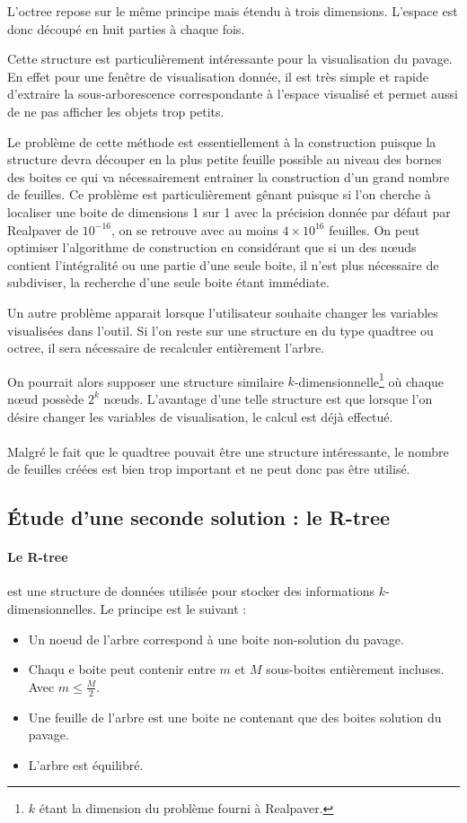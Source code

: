 \documentclass[11pt,a4paper,utf8x]{report}
\begin{document}
L'octree repose sur le même principe mais étendu à trois dimensions. L'espace est donc découpé en huit parties à chaque fois.

Cette structure est particulièrement intéressante pour la visualisation du pavage. En effet pour une fenêtre de visualisation donnée, il est très simple et rapide d'extraire la sous-arborescence correspondante à l'espace visualisé et permet aussi de ne pas afficher les objets trop petits.

Le problème de cette méthode est essentiellement à la construction puisque la structure devra découper en la plus petite feuille possible au niveau des bornes des boites ce qui va nécessairement entrainer la construction d'un grand nombre de feuilles. Ce problème est particulièrement gênant puisque si l'on cherche à localiser une boite de dimensions 1 sur 1 avec la précision donnée par défaut par Realpaver de $10^{-16}$, on se retrouve avec au moins $4 \times 10^{16}$ feuilles. On peut optimiser l'algorithme de construction en considérant que si un des nœuds contient l'intégralité ou une partie d'une seule boite, il n'est plus nécessaire de subdiviser, la recherche d'une seule boite étant immédiate.

Un autre problème apparait lorsque l'utilisateur souhaite changer les variables visualisées dans l'outil. Si l'on reste sur une structure en du type quadtree ou octree, il sera nécessaire de recalculer entièrement l'arbre.

On pourrait alors supposer une structure similaire $k$-dimensionnelle\footnote{$k$ étant la dimension du problème fourni à Realpaver.} où chaque nœud possède $2^k$ nœuds. L'avantage d'une telle structure est que lorsque l'on désire changer les variables de visualisation, le calcul est déjà effectué.

\paragraph{} Malgré le fait que le quadtree pouvait être une structure intéressante, le nombre de feuilles créées est bien trop important et ne peut donc pas être utilisé.

\subsection{\'Etude d'une seconde solution : le R-tree}
\paragraph{Le R-tree} est une structure de données utilisée pour stocker des informations $k$-dimensionnelles. Le principe est le suivant :
\begin{itemize}
 \item Un noeud de l'arbre correspond à une boite non-solution du pavage.
 \item Chaqu e boite peut contenir entre $m$ et $M$ sous-boites entièrement incluses. Avec $m\leq \frac{M}{2}$.
 \item Une feuille de l'arbre est une boite ne contenant que des boites solution du pavage.
 \item L'arbre est équilibré.
\end{itemize}
\end{document}
